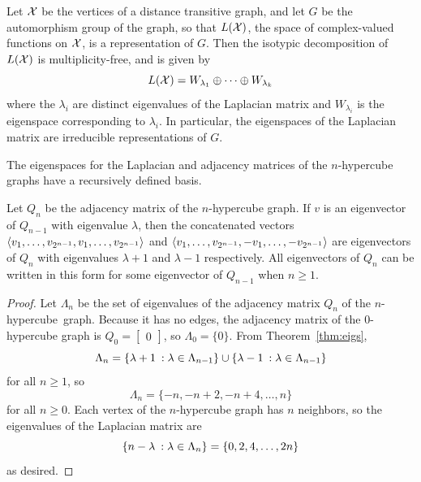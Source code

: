 \documentclass[cclicense]{hmcthesis}
\numberwithin{equation}{chapter}
\numberwithin{ucounter}{chapter}
\begin{document}
    \begin{theorem}
        Let $\mathcal{X}$ be the vertices of a distance transitive graph, and let $G$ be
        the automorphism group of the graph, so that $L(\mathcal{X})$, the space of
        complex-valued functions on $\mathcal{X}$, is a representation of $G$.  Then the
        isotypic decomposition of $L(\mathcal{X})$ is multiplicity-free, and is given by
        \[
            L(\mathcal{X}) = W_{\lambda_1} \oplus \cdots \oplus W_{\lambda_k}
        \]
        where the $\lambda_i$ are distinct eigenvalues of the Laplacian matrix
        and $W_{\lambda_i}$ is the eigenspace corresponding to $\lambda_i$.  In
        particular, the eigenspaces of the Laplacian matrix are irreducible
        representations of $G$.
        \label{thm:dist-trans}
    \end{theorem}

    The eigenspaces for the Laplacian and adjacency matrices of the
    $n$-hypercube graphs have a recursively defined basis.
    \begin{theorem}[\cite{CW06}]
        Let $Q_n$ be the adjacency matrix of the $n$-hypercube graph.  If $v$
        is an eigenvector of $Q_{n-1}$ with eigenvalue $\lambda$, then the
        concatenated vectors $\langle v_1, \ldots, v_{2^{n-1}},v_1, \ldots,
        v_{2^{n-1}}\rangle$ and $\langle v_1, \ldots, v_{2^{n-1}}, -v_1, \ldots,
        -v_{2^{n-1}}\rangle$ are eigenvectors of $Q_n$ with eigenvalues $\lambda +1$
        and $\lambda - 1$ respectively.  All eigenvectors of $Q_n$ can be
        written in this form for some eigenvector of $Q_{n-1}$ when $n \ge 1$.
        \label{thm:eigs}
    \end{theorem}
    \begin{proof}
        Let $\Lambda_n$ be the set of eigenvalues of the adjacency matrix $Q_n$
        of the \mbox{$n$-hypercube graph}.  Because it has no edges, the
        adjacency matrix of the $0$-hypercube graph is \mbox{$Q_0 =
        \begin{bmatrix} 0 \end{bmatrix}$}, so $\Lambda_0 = \{0\}$.  From
        Theorem~\ref{thm:eigs}, 
        \[
            \Lambda_n = 
            \{\lambda + 1 \:: \lambda \in \Lambda_{n-1}\}
            \cup
            \{\lambda - 1 \:: \lambda \in \Lambda_{n-1}\}
        \]
        for all $n \ge 1$, so
        \[
            \Lambda_n = \{-n, -n + 2, -n + 4, \ldots, n\}
        \]
        for all $n \ge 0$.  Each vertex of the $n$-hypercube graph has $n$
        neighbors, so the eigenvalues of the Laplacian matrix are
        \[
            \{n -\lambda \:: \lambda \in \Lambda_n\}
            =
            \{0, 2, 4, \ldots, 2n\}
        \]
        as desired.
    \end{proof}
\end{document}
